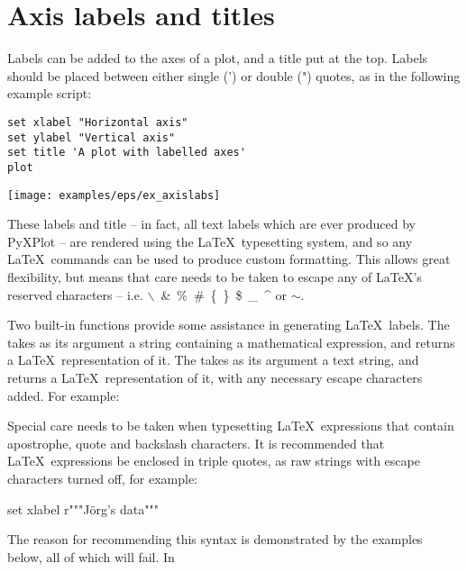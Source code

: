 \section{Axis labels and titles}
\label{sec:latex_incompatibility}

Labels can be added to the axes of a plot, and a title put at the top.  Labels
should be placed between either single (') or double (") quotes, as in the
following example script:

\begin{verbatim}
set xlabel "Horizontal axis"
set ylabel "Vertical axis"
set title 'A plot with labelled axes'
plot
\end{verbatim}

\begin{center}
\texttt{[image: examples/eps/ex\_axislabs]}
\end{center}

\noindent These labels and title -- in fact, all text labels which are ever
produced by PyXPlot -- are rendered using the \LaTeX\ typesetting system, and
so any \LaTeX\ commands can be used to produce custom formatting. This allows
great flexibility, but means that care needs to be taken to escape any of
\LaTeX's reserved characters -- i.e. $\backslash$~\&~\%~\#~\{~\}~\$~\_~\^{} or
$\sim$.

Two built-in functions provide some assistance in generating \LaTeX\ labels.
The  takes as its argument a string containing a mathematical
expression, and returns a \LaTeX\ representation of it.  The
 takes as its argument a text string, and returns a
\LaTeX\ representation of it, with any necessary escape characters added. For
example:

\vspace{3mm}

\vspace{3mm}

Special care needs to be taken when typesetting \LaTeX\ expressions that
contain apostrophe, quote and backslash characters.  It is recommended that
\LaTeX\ expressions be enclosed in triple quotes, as raw strings with escape
characters turned off, for example:

\begin{dodo}
set xlabel r"""\textrm{J\"org's data}"""
\end{dodo}

The reason for recommending this syntax is demonstrated by the examples below,
all of which will fail. In

